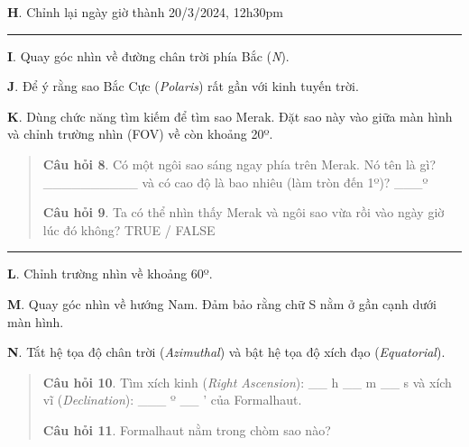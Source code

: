 \documentclass[
]{book}
\begin{document}
\textbf{H}. Chỉnh lại ngày giờ thành 20/3/2024, 12h30pm

\begin{center}\rule{0.5\linewidth}{0.5pt}\end{center}

\textbf{I}. Quay góc nhìn về đường chân trời phía Bắc (\emph{N}).

\textbf{J}. Để ý rằng sao Bắc Cực (\emph{Polaris}) rất gần với kinh tuyến trời.

\textbf{K}. Dùng chức năng tìm kiếm để tìm sao Merak. Đặt sao này vào giữa màn hình và chỉnh trường nhìn (FOV) về còn khoảng 20º.

\begin{quote}
\textbf{Câu hỏi 8}. Có một ngôi sao sáng ngay phía trên Merak. Nó tên là gì?
\_\_\_\_\_\_\_\_\_\_
và có cao độ là bao nhiêu (làm tròn đến 1º)?
\_\_\_º

\textbf{Câu hỏi 9}. Ta có thể nhìn thấy Merak và ngôi sao vừa rồi vào ngày giờ lúc đó không?
TRUE / FALSE
\end{quote}

\begin{center}\rule{0.5\linewidth}{0.5pt}\end{center}

\textbf{L}. Chỉnh trường nhìn về khoảng 60º.

\textbf{M}. Quay góc nhìn về hướng Nam. Đảm bảo rằng chữ S nằm ở gần cạnh dưới màn hình.

\textbf{N}. Tắt hệ tọa độ chân trời (\emph{Azimuthal}) và bật hệ tọa độ xích đạo (\emph{Equatorial}).

\begin{quote}
\textbf{Câu hỏi 10}. Tìm xích kinh (\emph{Right Ascension}):
\_\_ h
\_\_ m
\_\_ s
và xích vĩ (\emph{Declination}):
\_\_\_ º
\_\_ '
của Formalhaut.

\textbf{Câu hỏi 11}. Formalhaut nằm trong chòm sao nào?
\end{quote}
\end{document}
